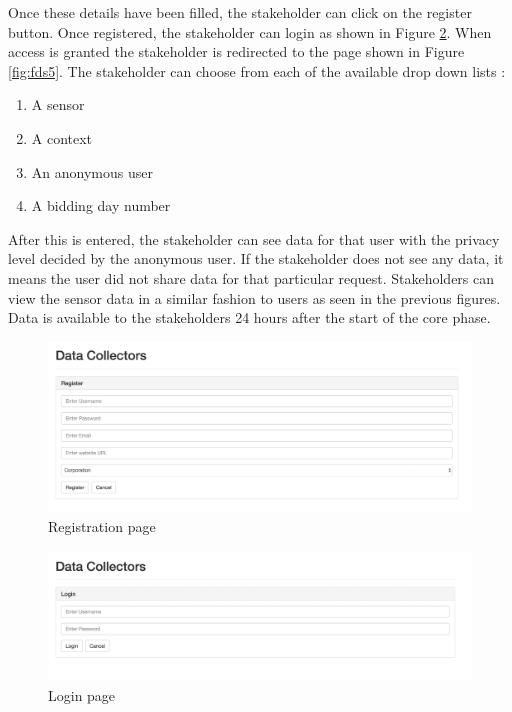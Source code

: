 Once these details have been filled, the stakeholder can click on the register button. Once registered, the stakeholder can login as shown in Figure \ref{fig:fdsdclogin}. When access is granted the stakeholder is redirected to the page shown in Figure \ref{fig:fds5}. The stakeholder can choose from each of the available drop down lists :

\begin{enumerate}
    \item A sensor
    \item A context
    \item An anonymous user
    \item A bidding day number
\end{enumerate}

After this is entered, the stakeholder can see data for that user with the privacy level decided by the anonymous user. If the stakeholder does not see any data, it means the user did not share data for that particular request. Stakeholders can view the sensor data in a similar fashion to users as seen in the previous figures. Data is available to the stakeholders 24 hours after the start of the core phase.



\begin{figure}[ht!]
\centering
\includegraphics[width=\textwidth,keepaspectratio]{./images/fds_dc_register1}
\caption{Registration page\label{fig:fdsdcregister}}
\end{figure}

\begin{figure}[ht!]
\centering
\includegraphics[width=\textwidth,keepaspectratio]{./images/fds_dc_login1}
\caption{Login page\label{fig:fdsdclogin}}
\end{figure}


